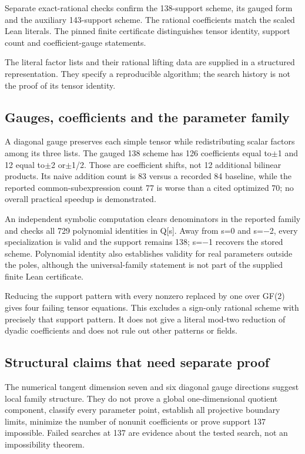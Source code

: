 \documentclass[11pt,a4paper]{article}
\begin{document}
Separate exact-rational checks confirm the 138-support scheme, its gauged form and the auxiliary 143-support scheme. The rational coefficients match the scaled Lean literals. The pinned finite certificate distinguishes tensor identity, support count and coefficient-gauge statements.

The literal factor lists and their rational lifting data are supplied in a structured representation. They specify a reproducible algorithm; the search history is not the proof of its tensor identity.

\subsection{Gauges, coefficients and the parameter family}
A diagonal gauge preserves each simple tensor while redistributing scalar factors among its three lists. The gauged 138 scheme has 126 coefficients equal to\ensuremath{\pm}1 and 12 equal to\ensuremath{\pm}2 or\ensuremath{\pm}1/2. Those are coefficient shifts, not 12 additional bilinear products. Its naive addition count is 83 versus a recorded 84 baseline, while the reported common-subexpression count 77 is worse than a cited optimized 70; no overall practical speedup is demonstrated.

An independent symbolic computation clears denominators in the reported family and checks all 729 polynomial identities in Q[s]. Away from s=0 and s=\ensuremath{-}2, every specialization is valid and the support remains 138; s=\ensuremath{-}1 recovers the stored scheme. Polynomial identity also establishes validity for real parameters outside the poles, although the universal-family statement is not part of the supplied finite Lean certificate.

Reducing the support pattern with every nonzero replaced by one over GF(2) gives four failing tensor equations. This excludes a sign-only rational scheme with precisely that support pattern. It does not give a literal mod-two reduction of dyadic coefficients and does not rule out other patterns or fields.

\subsection{Structural claims that need separate proof}
The numerical tangent dimension seven and six diagonal gauge directions suggest local family structure. They do not prove a global one-dimensional quotient component, classify every parameter point, establish all projective boundary limits, minimize the number of nonunit coefficients or prove support 137 impossible. Failed searches at 137 are evidence about the tested search, not an impossibility theorem.
\end{document}

